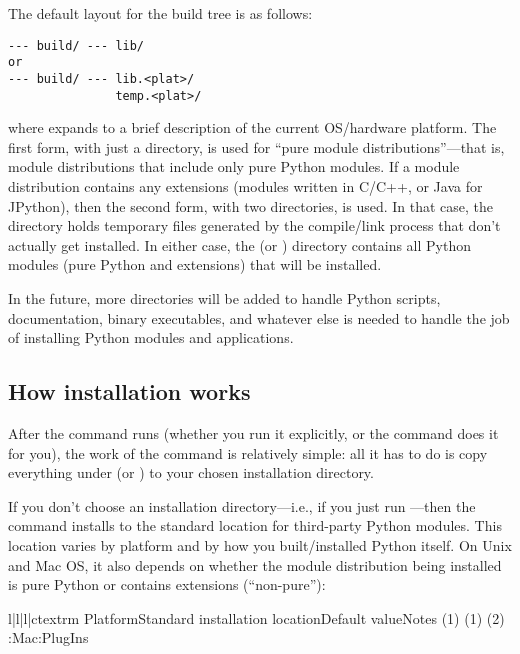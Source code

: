 \documentclass{howto}
\begin{document}
The default layout for the build tree is as follows:
\begin{verbatim}
--- build/ --- lib/
or
--- build/ --- lib.<plat>/
               temp.<plat>/
\end{verbatim}
where  expands to a brief description of the current
OS/hardware platform.  The first form, with just a  directory,
is used for ``pure module distributions''---that is, module
distributions that include only pure Python modules.  If a module
distribution contains any extensions (modules written in C/C++, or Java
for JPython), then the second form, with two  directories,
is used.  In that case, the  directory holds
temporary files generated by the compile/link process that don't
actually get installed.  In either case, the  (or
) directory contains all Python modules (pure
Python and extensions) that will be installed.

In the future, more directories will be added to handle Python scripts,
documentation, binary executables, and whatever else is needed to handle
the job of installing Python modules and applications.


\subsection{How installation works}
\label{how-install-works}

After the  command runs (whether you run it explicitly,
or the  command does it for you), the work of the
 command is relatively simple: all it has to do is copy
everything under  (or )
to your chosen installation directory.

If you don't choose an installation directory---i.e., if you just run
---then the  command installs to
the standard location for third-party Python modules.  This location
varies by platform and by how you built/installed Python itself.  On
Unix and Mac OS, it also depends on whether the module distribution
being installed is pure Python or contains extensions (``non-pure''):
\begin{tableiv}{l|l|l|c}{textrm}%
  {Platform}{Standard installation location}{Default value}{Notes}
          {}
          {}
          {(1)}
          {}
          {}
          {(1)}
          {}
          {}
          {(2)}
          {}
          {  }
          {}
          {:Mac:PlugIns}
          {}
          {}
\end{tableiv}
\end{document}
